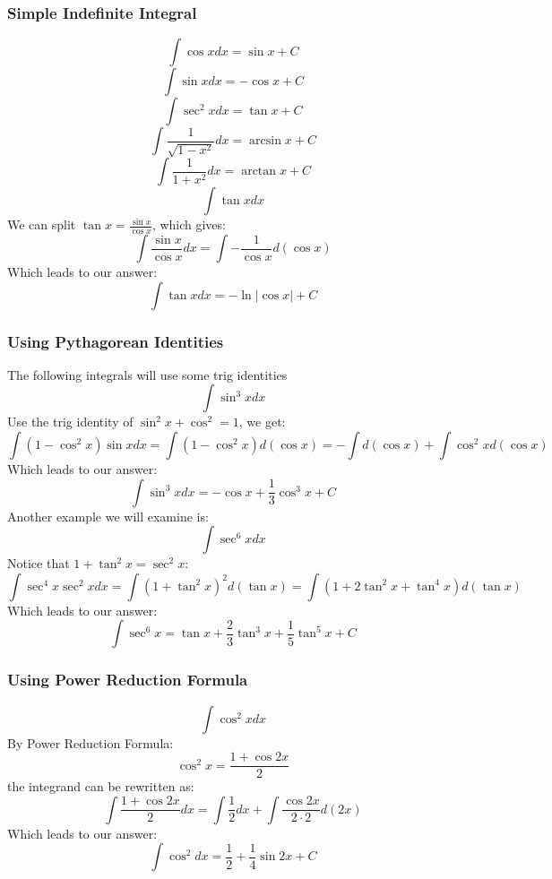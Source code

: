 \documentclass{article}
\begin{document}
\subsubsection{Simple Indefinite Integral}
\begin{equation}
    \int \cos x dx = \sin x + C
\end{equation}
\begin{equation}
    \int \sin x dx = -\cos x + C
\end{equation}
\begin{equation}
    \int \sec^2 x dx = \tan x + C
\end{equation}
\begin{equation}
    \int \frac{1}{\sqrt{1-x^2}} dx = \arcsin x + C
\end{equation}
\begin{equation}
    \int \frac{1}{1+x^2} dx = \arctan x + C
\end{equation}
\[
    \int \tan x dx
\]
We can split $\tan x = \frac{\sin x}{\cos x}$, which gives:
\[
    \int \frac{\sin x}{\cos x} dx= \int -\frac{1}{\cos x} d(\cos x)
\]
Which leads to our answer:
\begin{equation}
    \int \tan x dx = -\ln|\cos x| + C
\end{equation}

\subsubsection{Using Pythagorean Identities}
The following integrals will use some trig identities
\[
    \int \sin^3 x dx
\]
Use the trig identity of $\sin^2 x + \cos^2 = 1$, we get:
\[
    \int (1 - \cos^2 x) \sin x dx = \int (1 - \cos^2 x) d(\cos x) = -\int d(\cos x) + \int \cos^2 x d(\cos x)
\]
Which leads to our answer:
\begin{equation}
    \int \sin^3 x dx = -\cos x + \frac{1}{3}\cos^3 x + C
\end{equation}
Another example we will examine is:
\[
    \int \sec^6 x dx
\]
Notice that $1 + \tan^2 x = \sec^2 x$:
\[
    \int \sec^4 x \sec^2 x dx = \int (1 + \tan^2 x)^2 d(\tan x) = \int (1 + 2\tan^2 x + \tan^4 x)d(\tan x)
\]
Which leads to our answer:
\begin{equation}
    \int \sec^6 x = \tan x + \frac{2}{3}\tan^3 x + \frac{1}{5}\tan^5 x + C
\end{equation}

\newpage
\subsubsection{Using Power Reduction Formula}
\[
    \int \cos^2 x dx 
\]
By Power Reduction Formula: 
\[
    \cos^2 x = \frac{1 + \cos 2x}{2}
\]
the integrand can be rewritten as:
\[
    \int \frac{1 + \cos 2x}{2}dx = \int \frac{1}{2}dx + \int \frac{\cos 2x}{2\cdot 2} d(2x)
\]
Which leads to our answer:
\begin{equation}
    \int \cos^2 dx = \frac{1}{2} + \frac{1}{4} \sin 2x + C
\end{equation}
\end{document}
